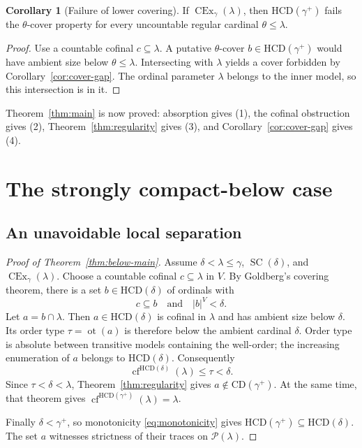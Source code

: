 \documentclass[11pt,letterpaper]{article}
\theoremstyle{definition}
\newtheorem{corollary}[definition]{Corollary}
\newcommand{\SC}{\operatorname{SC}}
\newcommand{\CEx}{\operatorname{CEx}}
\newcommand{\cf}{\operatorname{cf}}
\newcommand{\ot}{\operatorname{ot}}
\newcommand{\CD}{\mathrm{CD}}
\newcommand{\HCD}{\mathrm{HCD}}
\newcommand{\Pow}{\mathcal{P}}
\begin{document}
\begin{corollary}[Failure of lower covering]\label{cor:failure-cover}
If $\CEx_\gamma(\lambda)$, then $\HCD(\gamma^+)$ fails the $\theta$-cover property for every uncountable regular cardinal $\theta\le\lambda$.
\end{corollary}
\begin{proof}
Use a countable cofinal $c\subseteq\lambda$. A putative $\theta$-cover $b\in\HCD(\gamma^+)$ would have ambient size below $\theta\le\lambda$. Intersecting with $\lambda$ yields a cover forbidden by Corollary~\ref{cor:cover-gap}. The ordinal parameter $\lambda$ belongs to the inner model, so this intersection is in it.
\end{proof}

Theorem~\ref{thm:main} is now proved: absorption gives (1), the cofinal obstruction gives (2), Theorem~\ref{thm:regularity} gives (3), and Corollary~\ref{cor:cover-gap} gives (4).

\section{The strongly compact-below case}\label{sec:below}

\subsection{An unavoidable local separation}

\begin{proof}[Proof of Theorem~\ref{thm:below-main}]
Assume $\delta<\lambda\le\gamma$, $\SC(\delta)$, and $\CEx_\gamma(\lambda)$. Choose a countable cofinal $c\subseteq\lambda$ in $V$. By Goldberg's covering theorem, there is a set $b\in\HCD(\delta)$ of ordinals with
\[
c\subseteq b\quad\text{and}\quad |b|^V<\delta.
\]
Let $a=b\cap\lambda$. Then $a\in\HCD(\delta)$ is cofinal in $\lambda$ and has ambient size below $\delta$. Its order type $\tau=\ot(a)$ is therefore below the ambient cardinal $\delta$. Order type is absolute between transitive models containing the well-order; the increasing enumeration of $a$ belongs to $\HCD(\delta)$. Consequently
\[
\cf^{\HCD(\delta)}(\lambda)\le\tau<\delta.
\]
Since $\tau<\delta<\lambda$, Theorem~\ref{thm:regularity} gives $a\notin\CD(\gamma^+)$. At the same time, that theorem gives $\cf^{\HCD(\gamma^+)}(\lambda)=\lambda$.

Finally $\delta<\gamma^+$, so monotonicity \eqref{eq:monotonicity} gives $\HCD(\gamma^+)\subseteq\HCD(\delta)$. The set $a$ witnesses strictness of their traces on $\Pow(\lambda)$.
\end{proof}
\end{document}
